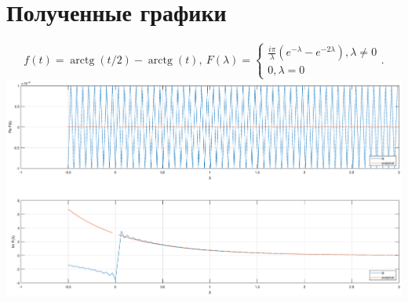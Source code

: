 \documentclass[11pt]{article}
\DeclareMathOperator{\arctg}{arctg}
\begin{document}
\section{Полученные графики}


\newline
\[f(t) = \arctg(t/2) - \arctg(t),\ F(\lambda) = \begin{cases}\frac{i\pi}{\lambda}(e^{-\lambda} - e^{-2\lambda}), \lambda \neq 0 \\ 0, \lambda = 0\end{cases}.\]
\includegraphics[width=1\textwidth]{f1.eps}
\end{document}
